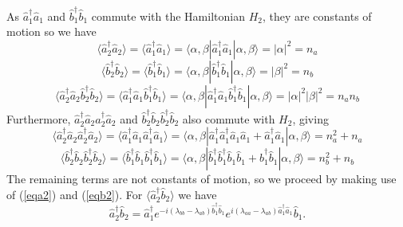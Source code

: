 \documentclass{iopart}
\begin{document}
As $\hat{a}^{\dagger}_1 \hat{a}_1$ and $\hat{b}^{\dagger}_1 \hat{b}_1$ commute with the Hamiltonian $H_2$, they are constants of motion so we have
\begin{equation}
\langle \hat{a}^{\dagger}_2 \hat{a}_2 \rangle = \langle \hat{a}^{\dagger}_1 \hat{a}_1 \rangle = \langle \alpha, \beta | \hat{a}^{\dagger}_1 \hat{a}_1 |\alpha, \beta \rangle = |\alpha|^2 = n_a
\end{equation}
%
\begin{equation}
\langle \hat{b}^{\dagger}_2 \hat{b}_2 \rangle = \langle \hat{b}^{\dagger}_1 \hat{b}_1 \rangle = \langle \alpha, \beta | \hat{b}^{\dagger}_1 \hat{b}_1 |\alpha, \beta \rangle = |\beta|^2 = n_b
\end{equation}
%
\begin{equation}
\langle \hat{a}^{\dagger}_2 \hat{a}_2 \hat{b}^{\dagger}_2 \hat{b}_2 \rangle = \langle \hat{a}^{\dagger}_1 \hat{a}_1 \hat{b}^{\dagger}_1 \hat{b}_1 \rangle = \langle \alpha, \beta | \hat{a}^{\dagger}_1 \hat{a}_1 \hat{b}^{\dagger}_1 \hat{b}_1 |\alpha, \beta \rangle = |\alpha|^2 |\beta|^2 = n_a n_b
\end{equation}
Furthermore, $\hat{a}^{\dagger}_2 \hat{a}_2 \hat{a}^{\dagger}_2 \hat{a}_2$ and $\hat{b}^{\dagger}_2 \hat{b}_2 \hat{b}^{\dagger}_2 \hat{b}_2$ also commute with $H_2$, giving
\begin{equation}
\langle \hat{a}^{\dagger}_2 \hat{a}_2 \hat{a}^{\dagger}_2 \hat{a}_2 \rangle = \langle \hat{a}^{\dagger}_1 \hat{a}_1 \hat{a}^{\dagger}_1 \hat{a}_1 \rangle = \langle \alpha, \beta | \hat{a}^{\dagger}_1 \hat{a}^{\dagger}_1 \hat{a}_1 \hat{a}_1 + \hat{a}^{\dagger}_1 \hat{a}_1 |\alpha, \beta \rangle = n_a^2 + n_a
\end{equation}
%
\begin{equation}
\langle \hat{b}^{\dagger}_2 \hat{b}_2 \hat{b}^{\dagger}_2 \hat{b}_2 \rangle = \langle \hat{b}^{\dagger}_1 \hat{b}_1 \hat{b}^{\dagger}_1 \hat{b}_1 \rangle = \langle \alpha, \beta | \hat{b}^{\dagger}_1 \hat{b}^{\dagger}_1 \hat{b}_1 \hat{b}_1 + \hat{b}^{\dagger}_1 \hat{b}_1 |\alpha, \beta \rangle = n_b^2 + n_b
\end{equation}
The remaining terms are not constants of motion, so we proceed by making use of (\ref{eqa2}) and (\ref{eqb2}). For $\langle \hat{a}^{\dagger}_2 \hat{b}_2 \rangle$ we have
\begin{equation}
\hat{a}^{\dagger}_2 \hat{b}_2 = \hat{a}^{\dagger}_1 e^{-i (\lambda_{bb} - \lambda_{ab}) \hat{b}^{\dagger}_1 \hat{b}_1} e^{i (\lambda_{aa} - \lambda_{ab}) \hat{a}^{\dagger}_1 \hat{a}_1} \hat{b}_1. 
\end{equation}
\end{document}
